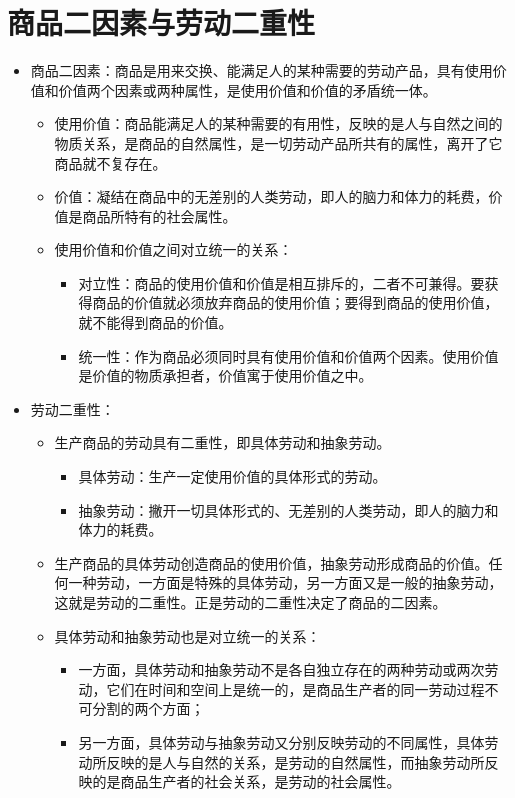 \documentclass[12pt,openany]{ctexbook}
\begin{document}
\section{商品二因素与劳动二重性}
\begin{itemize}
  \item 商品二因素：商品是用来交换、能满足人的某种需要的劳动产品，具有使用价值和价值两个因素或两种属性，是使用价值和价值的矛盾统一体。
\begin{itemize}
  \item 使用价值：商品能满足人的某种需要的有用性，反映的是人与自然之间的物质关系，是商品的自然属性，是一切劳动产品所共有的属性，离开了它商品就不复存在。
  \item 价值：凝结在商品中的无差别的人类劳动，即人的脑力和体力的耗费，价值是商品所特有的社会属性。
  \item 使用价值和价值之间对立统一的关系：
\begin{itemize}
  \item 对立性：商品的使用价值和价值是相互排斥的，二者不可兼得。要获得商品的价值就必须放弃商品的使用价值；要得到商品的使用价值，就不能得到商品的价值。
  \item 统一性：作为商品必须同时具有使用价值和价值两个因素。使用价值是价值的物质承担者，价值寓于使用价值之中。
\end{itemize}
\end{itemize}
  \item 劳动二重性：
\begin{itemize}
  \item 生产商品的劳动具有二重性，即具体劳动和抽象劳动。
\begin{itemize}
  \item 具体劳动：生产一定使用价值的具体形式的劳动。
  \item 抽象劳动：撇开一切具体形式的、无差别的人类劳动，即人的脑力和体力的耗费。
\end{itemize}
  \item 生产商品的具体劳动创造商品的使用价值，抽象劳动形成商品的价值。任何一种劳动，一方面是特殊的具体劳动，另一方面又是一般的抽象劳动，这就是劳动的二重性。正是劳动的二重性决定了商品的二因素。
  \item 具体劳动和抽象劳动也是对立统一的关系：
\begin{itemize}
  \item 一方面，具体劳动和抽象劳动不是各自独立存在的两种劳动或两次劳动，它们在时间和空间上是统一的，是商品生产者的同一劳动过程不可分割的两个方面；
  \item 另一方面，具体劳动与抽象劳动又分别反映劳动的不同属性，具体劳动所反映的是人与自然的关系，是劳动的自然属性，而抽象劳动所反映的是商品生产者的社会关系，是劳动的社会属性。
\end{itemize}
\end{itemize}
\end{itemize}
\end{document}
